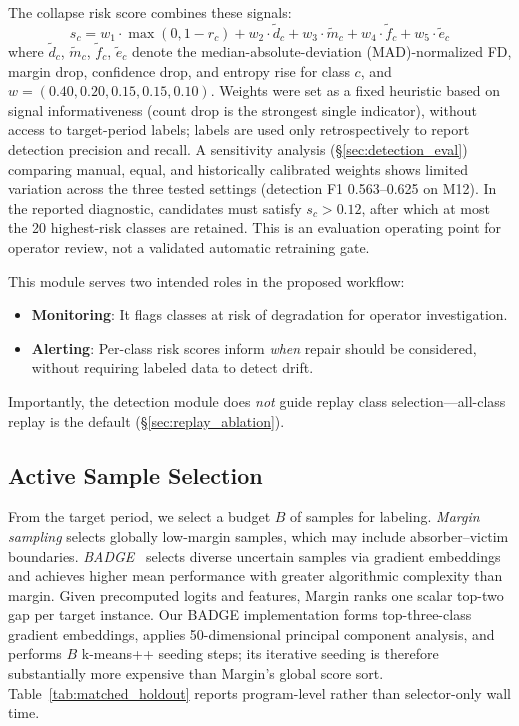 \documentclass[journal]{IEEEtran}
\begin{document}
The collapse risk score combines these signals:
\begin{equation}
  s_c = w_1 \cdot \max(0, 1{-}r_c) + w_2 \cdot \tilde{d}_c + w_3 \cdot \tilde{m}_c + w_4 \cdot \tilde{f}_c + w_5 \cdot \tilde{e}_c
\end{equation}
where $\tilde{d}_c$, $\tilde{m}_c$, $\tilde{f}_c$, $\tilde{e}_c$ denote the median-absolute-deviation (MAD)-normalized FD, margin drop, confidence drop, and entropy rise for class $c$, and $w = (0.40, 0.20, 0.15, 0.15, 0.10)$.
Weights were set as a fixed heuristic based on signal informativeness (count drop is the strongest single indicator), without access to target-period labels; labels are used only retrospectively to report detection precision and recall.
A sensitivity analysis (\S\ref{sec:detection_eval}) comparing manual, equal, and historically calibrated weights shows limited variation across the three tested settings (detection F1 0.563--0.625 on M12).
In the reported diagnostic, candidates must satisfy $s_c>0.12$, after which at most the 20 highest-risk classes are retained.
This is an evaluation operating point for operator review, not a validated automatic retraining gate.

This module serves two intended roles in the proposed workflow:
\begin{itemize}
  \item \textbf{Monitoring}: It flags classes at risk of degradation for operator investigation.
  \item \textbf{Alerting}: Per-class risk scores inform \textit{when} repair should be considered, without requiring labeled data to detect drift.
\end{itemize}
Importantly, the detection module does \textit{not} guide replay class selection---all-class replay is the default (\S\ref{sec:replay_ablation}).

\subsection{Active Sample Selection}
\label{sec:sample_select}

From the target period, we select a budget $B$ of samples for labeling.
\textit{Margin sampling} selects globally low-margin samples, which may include absorber--victim boundaries.
\textit{BADGE}~\cite{ash2020badge} selects diverse uncertain samples via gradient embeddings and achieves higher mean performance with greater algorithmic complexity than margin.
Given precomputed logits and features, Margin ranks one scalar top-two gap per target instance. Our BADGE implementation forms top-three-class gradient embeddings, applies 50-dimensional principal component analysis, and performs $B$ k-means++ seeding steps; its iterative seeding is therefore substantially more expensive than Margin's global score sort. Table~\ref{tab:matched_holdout} reports program-level rather than selector-only wall time.
\end{document}
